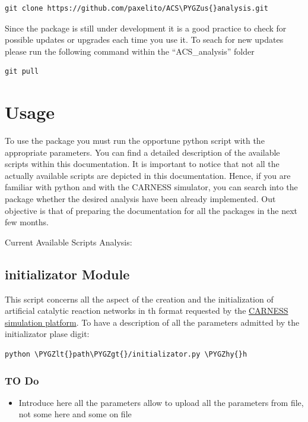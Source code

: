 \documentclass[letterpaper,10pt,english]{sphinxmanual}
\def\PYGZus{\char`\_}
\def\PYGZlt{\char`\<}
\def\PYGZgt{\char`\>}
\def\PYGZhy{\char`\-}
\begin{document}
\begin{Verbatim}[commandchars=\\\{\}]
git clone https://github.com/paxelito/ACS\PYGZus{}analysis.git
\end{Verbatim}

Since the package is still under development it is a good practice to check for possible updates or upgrades each time you use it. To seach for new updates please run the following command within the ``ACS\_analysis'' folder

\begin{Verbatim}[commandchars=\\\{\}]
git pull
\end{Verbatim}


\chapter{Usage}
\label{index:usage}
To use the package you must run the opportune python script with the appropriate parameters. You can find a detailed description of the available scripts within this documentation.
It is important to notice that not all the actually available scripts are depicted in this documentation. Hence, if you are familiar with python and with the CARNESS simulator, you can search into the package whether the desired analysis have been already implemented.
Out objective is that of preparing the documentation for all the packages in the next few months.

Current Available Scripts Analysis:


\section{initializator Module}
\label{initializator:initializator-module}\label{initializator::doc}\label{initializator:module-initializator}
This script concerns all the aspect of the creation and the initialization of artificial catalytic reaction networks in th format 
requested by the \href{http://github.org/carness}{CARNESS simulation platform}.
To have a description of all the parameters admitted by the initializator plase digit:

\begin{Verbatim}[commandchars=\\\{\}]
python \PYGZlt{}path\PYGZgt{}/initializator.py \PYGZhy{}h
\end{Verbatim}


\subsection{TO Do}
\label{initializator:to-do}\begin{itemize}
\item {} 
Introduce here all the parameters allow to upload all the parameters from file, not some here and some on file

\end{itemize}
\end{document}
